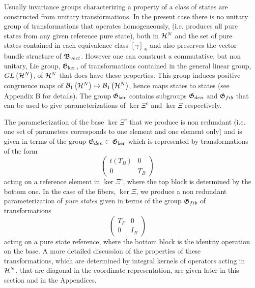 Usually invariance groups characterizing a property of a class of states are
constructed from unitary transformations. In the present case there is no
unitary group of transformations that operates homogeneously, (i.e. produces
all pure states from any given reference pure state), both in ${\cal H}^{N}$
and the set of pure states contained in each equivalence class $\left[
\gamma \right] _{N}$ and also preserves the vector bundle structure of $%
{\frak B}_{vect}$. However one can construct a commutative, but non unitary,
Lie group, ${\frak G}_{\ker }$, of transformations contained in the general
linear group, $GL\left( {\cal H}^{N}\right) $, of ${\cal H}^{N}$ that does
have these properties. This group induces positive congruence maps of ${\cal %
B}_{1}\left( {\cal H}^{N}\right) \mapsto {\cal B}_{1}\left( {\cal H}%
^{N}\right) $, hence maps states to states (see Appendix B for details). The
group ${\frak G}_{\ker }$ contains subgroups ${\frak G}_{den}$ and ${\frak G}%
_{fib}$ that can be used to give parameterizations of $\ker \Xi ^{c}$ and $%
\ker \Xi $ respectively.

The parameterization of the base $\ker \Xi ^{c}$ that we produce is non
redundant (i.e. one set of parameters corresponds to one element and one
element only) and is given in terms of the group ${\frak G}_{den}\subset 
{\frak G}_{\ker }$ which is represented by transformations of the form 
\begin{equation}
\left( 
\begin{array}{cc}
t\left( T_{B}\right) & 0 \\ 
0 & T_{B}%
\end{array}%
\right)
\end{equation}%
acting on a reference element in $\ker \Xi ^{c}$, where the top block is
determined by the bottom one. In the case of the fibers, $\ker \Xi $, we
produce a non redundant parameterization of {\it pure states }given in terms
of the group ${\frak G}_{fib}$ of transformations 
\begin{equation}
\left( 
\begin{array}{cc}
T_{F} & 0 \\ 
0 & I_{B}%
\end{array}%
\right)
\end{equation}%
acting on a pure state reference, where the bottom block is the identity
operation on the base. A more detailed discussion of the properties of these
transformations, which are determined by integral kernels of operators
acting in ${\cal H}^{N}$, that are diagonal in the coordinate
representation, are given later in this section and in the Appendices.

